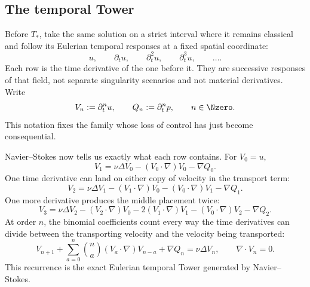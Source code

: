 \subsection{The temporal Tower}\label{sub:BodyFiniteTimeResponseEscalation}

Before \(T_*\), take the same solution on a strict interval where it remains classical and follow its Eulerian temporal responses at a fixed spatial coordinate:
\[
  u,
  \qquad
  \partial_tu,
  \qquad
  \partial_t^2u,
  \qquad
  \partial_t^3u,
  \qquad
  \ldots .
\]
Each row is the time derivative of the one before it.
They are successive responses of that field, not separate singularity scenarios and not material derivatives.
Write
\begin{equation}\label{eq:TemporalTowerDefinitionBody}
  V_n:=\partial_t^nu,
  \qquad
  Q_n:=\partial_t^np,
  \qquad
  n\in\Nzero.
\end{equation}
This notation fixes the family whose loss of control has just become consequential.

Navier--Stokes now tells us exactly what each row contains.
For \(V_0=u\),
\[
  V_1
  =\nu\Delta V_0
  -(V_0\cdot\nabla)V_0
  -\nabla Q_0.
\]
One time derivative can land on either copy of velocity in the transport term:
\[
  V_2
  =\nu\Delta V_1
  -(V_1\cdot\nabla)V_0
  -(V_0\cdot\nabla)V_1
  -\nabla Q_1.
\]
One more derivative produces the middle placement twice:
\[
  V_3
  =\nu\Delta V_2
  -(V_2\cdot\nabla)V_0
  -2(V_1\cdot\nabla)V_1
  -(V_0\cdot\nabla)V_2
  -\nabla Q_2.
\]
At order \(n\), the binomial coefficients count every way the time derivatives can divide between the transporting velocity and the velocity being transported:
\begin{equation}\label{eq:BodyTemporalVelocityRecurrence}
  V_{n+1}
  +\sum_{a=0}^{n}\binom{n}{a}(V_a\cdot\nabla)V_{n-a}
  +\nabla Q_n
  =\nu\Delta V_n,
  \qquad
  \nabla\cdot V_n=0.
\end{equation}
This recurrence is the exact Eulerian temporal Tower generated by Navier--Stokes.

